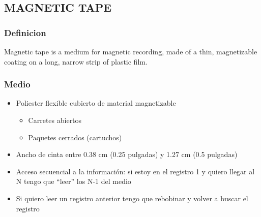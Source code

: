 \subsection{MAGNETIC TAPE}
\subsubsection{Definicion}
Magnetic tape is a medium for magnetic recording, made of a thin, magnetizable coating on a long, narrow strip of plastic film.

\subsubsection{Medio}
\begin{itemize}
\item Poliester flexible cubierto de material magnetizable
	\begin{itemize}
	\item Carretes abiertos
	\item Paquetes cerrados (cartuchos)
	\end{itemize}
\item Ancho de cinta entre 0.38 cm (0.25 pulgadas) y 1.27 cm (0.5 pulgadas)
\item Acceso secuencial a la información: si estoy en el registro 1 y quiero llegar al N tengo que “leer” los N-1 del medio
\item Si quiero leer un registro anterior tengo que rebobinar y volver a buscar el registro
\end{itemize}

